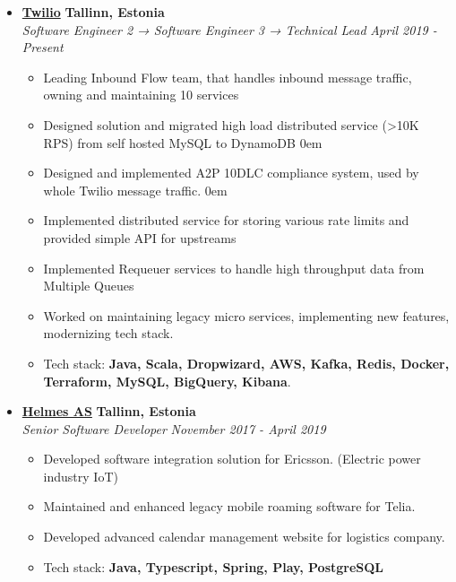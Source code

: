 \documentclass[10pt,letterpaper]{article}
\begin{document}
  \begin{itemize}
    \parskip=-0.5em
    
         \item[]
    {\href{https://www.twilio.com/}{\textbf{Twilio}} \hfill
      \textbf{Tallinn, Estonia}}
    \\
    {\emph{Software Engineer 2 → Software Engineer 3 → Technical Lead} \hfill \emph{April 2019 - Present}}
    \begin{itemize}[label=\textbullet]
      \itemsep0em
      \item Leading Inbound Flow team, that handles inbound message traffic, owning and maintaining 10 services
      \item Designed solution and migrated high load distributed service (>10K RPS) from self hosted MySQL to DynamoDB
      \itemsep0em
      \item Designed and implemented A2P 10DLC compliance system, used by whole Twilio message traffic.
      \itemsep0em
      \item Implemented distributed service for storing various rate limits and provided simple API for upstreams
      \item Implemented Requeuer services to handle high throughput data from Multiple Queues
      \item Worked on maintaining legacy micro services, implementing new features, modernizing tech stack.
      \item {Tech stack: \textbf{Java, Scala, Dropwizard, AWS, Kafka, Redis, Docker, Terraform, MySQL, BigQuery, Kibana}.}
    \end{itemize}
    \hfill \break
    
    \item[]
    {\href{https://www.helmes.com/}{\textbf{Helmes AS}} \hfill
      \textbf{Tallinn, Estonia}}
    \\
    {\emph{Senior Software Developer} \hfill \emph{November 2017 - April 2019}}

    \begin{itemize}[label=\textbullet]
      \itemsep0em
      \item Developed software integration solution for Ericsson. (Electric power industry IoT)
      \item Maintained and enhanced legacy mobile roaming software for Telia.
      \item Developed advanced calendar management website for logistics company.
      \item {Tech stack: \textbf{Java, Typescript, Spring, Play, PostgreSQL}}
    \end{itemize}
    \hfill \break
    

\end{itemize}
\end{document}
